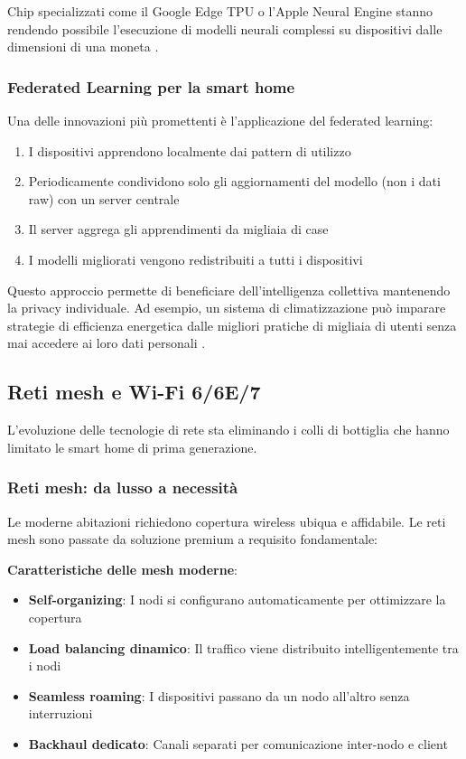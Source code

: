 Chip specializzati come il Google Edge TPU o l'Apple Neural Engine stanno rendendo possibile l'esecuzione di modelli neurali complessi su dispositivi dalle dimensioni di una moneta \parencite{chen2023smart}.

\subsubsection{Federated Learning per la smart home}

Una delle innovazioni più promettenti è l'applicazione del federated learning:

\begin{enumerate}
    \item I dispositivi apprendono localmente dai pattern di utilizzo
    \item Periodicamente condividono solo gli aggiornamenti del modello (non i dati raw) con un server centrale
    \item Il server aggrega gli apprendimenti da migliaia di case
    \item I modelli migliorati vengono redistribuiti a tutti i dispositivi
\end{enumerate}

Questo approccio permette di beneficiare dell'intelligenza collettiva mantenendo la privacy individuale. Ad esempio, un sistema di climatizzazione può imparare strategie di efficienza energetica dalle migliori pratiche di migliaia di utenti senza mai accedere ai loro dati personali \parencite{ieeeAI}.

\subsection{Reti mesh e Wi-Fi 6/6E/7}

L'evoluzione delle tecnologie di rete sta eliminando i colli di bottiglia che hanno limitato le smart home di prima generazione.

\subsubsection{Reti mesh: da lusso a necessità}

Le moderne abitazioni richiedono copertura wireless ubiqua e affidabile. Le reti mesh sono passate da soluzione premium a requisito fondamentale:

\textbf{Caratteristiche delle mesh moderne}:
\begin{itemize}
    \item \textbf{Self-organizing}: I nodi si configurano automaticamente per ottimizzare la copertura
    \item \textbf{Load balancing dinamico}: Il traffico viene distribuito intelligentemente tra i nodi
    \item \textbf{Seamless roaming}: I dispositivi passano da un nodo all'altro senza interruzioni
    \item \textbf{Backhaul dedicato}: Canali separati per comunicazione inter-nodo e client
\end{itemize}

